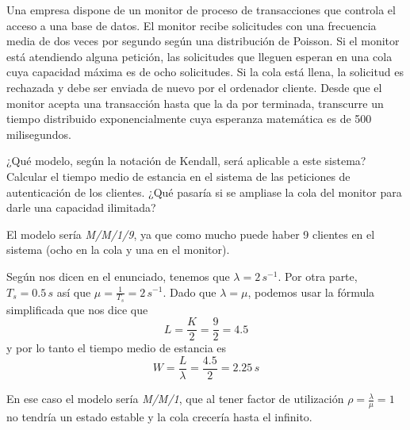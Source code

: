 \begin{problem}[26]
Una empresa dispone de un monitor de proceso de transacciones que controla el acceso a una base de datos. El monitor recibe solicitudes con una frecuencia media de dos veces por segundo según una distribución de Poisson. Si el monitor está atendiendo alguna petición, las solicitudes que lleguen esperan en una cola cuya capacidad máxima es de ocho solicitudes. Si la cola está llena, la solicitud es rechazada y debe ser enviada de nuevo por el ordenador cliente.
Desde que el monitor acepta una transacción hasta que la da por terminada, transcurre un tiempo distribuido exponencialmente cuya esperanza matemática es de 500 milisegundos.

\ppart ¿Qué modelo, según la notación de Kendall, será aplicable a este sistema?
\ppart Calcular el tiempo medio de estancia en el sistema de las peticiones de autenticación de los clientes.
\ppart ¿Qué pasaría si se ampliase la cola del monitor para darle una capacidad ilimitada?

\solution


\spart

El modelo sería \textit{M/M/1/9}, ya que como mucho puede haber 9 clientes en el sistema (ocho en la cola y una en el monitor).

\spart

Según nos dicen en el enunciado, tenemos que $λ = 2\,s^{-1}$. Por otra parte, $T_s = 0.5\,s$ así que $μ = \frac{1}{T_s} = 2\,s^{-1}$. Dado que $λ = μ$, podemos usar la fórmula simplificada que nos dice que \[ L = \frac{K}{2} = \frac{9}{2} = 4.5 \] y por lo tanto el tiempo medio de estancia es \[ W = \frac{L}{λ} = \frac{4.5}{2} = 2.25\,s\]

\spart En ese caso el modelo sería \textit{M/M/1}, que al tener factor de utilización $ρ = \frac{λ}{μ} = 1$ no tendría un estado estable y la cola crecería hasta el infinito.

\end{problem}

